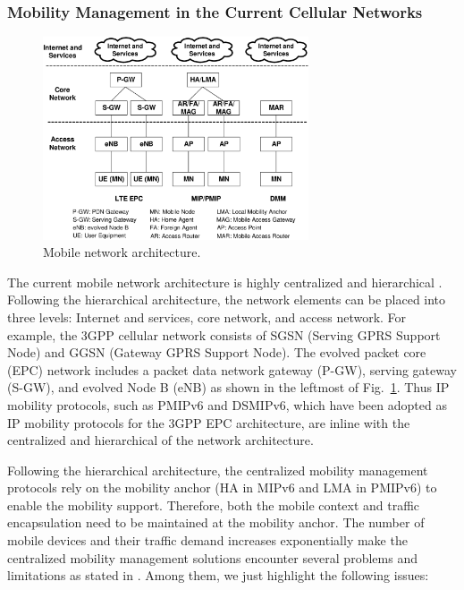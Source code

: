 \subsubsection{Mobility Management in the Current Cellular Networks}
\begin{figure}[h!] 
 \begin{center} 
 \includegraphics[width=0.70\textwidth]{./Part1/Chapter2/figures/c3_network_level.eps} 
    \caption{Mobile network architecture.}
     \label{fig:c3_network_level}
  \end{center} 
\end{figure}

The current mobile network architecture is highly centralized and hierarchical \cite{DMM_Bertin}. Following the hierarchical architecture, the network elements can be placed into three levels: Internet and services, core network, and access network. For example, the 3GPP cellular network consists of SGSN (Serving GPRS Support Node) and GGSN (Gateway GPRS Support Node). The evolved packet core (EPC) network \cite{3gpp.23.002} includes a packet data network gateway (P-GW), serving gateway (S-GW), and evolved Node B (eNB) as shown in the leftmost of Fig.~\ref{fig:c3_network_level}. Thus IP mobility protocols, such as PMIPv6 and DSMIPv6, which have been adopted as IP mobility protocols for the 3GPP EPC architecture, are inline with the centralized and hierarchical of the network architecture. 

Following the hierarchical architecture, the centralized mobility management protocols rely on the mobility anchor (HA in MIPv6 and LMA in PMIPv6) to enable the mobility support. Therefore, both the mobile context and traffic encapsulation need to be maintained at the mobility anchor. The number of mobile devices and their traffic demand increases exponentially make the centralized mobility management solutions encounter several problems and limitations as stated in \cite{DMM_issues,DMM_problem_statement}. Among them, we just highlight the following issues:

